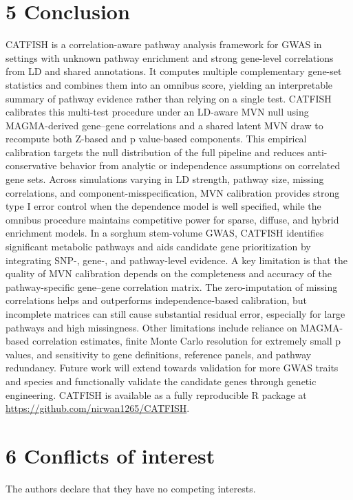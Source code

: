 \documentclass[unnumsec,webpdf,contemporary,large]{oup-authoring-template}%
\theoremstyle{thmstyleone}%
\theoremstyle{thmstyletwo}%
\theoremstyle{thmstylethree}%
\begin{document}
\section{5 Conclusion}

CATFISH is a correlation-aware pathway analysis framework for GWAS in settings with unknown pathway enrichment and strong gene-level correlations from LD and shared annotations. It computes multiple complementary gene-set statistics and combines them into an omnibus score, yielding an interpretable summary of pathway evidence rather than relying on a single test. CATFISH calibrates this multi-test procedure under an LD-aware MVN null using MAGMA-derived gene–gene correlations and a shared latent MVN draw to recompute both Z-based and p value-based components. This empirical calibration targets the null distribution of the full pipeline and reduces anti-conservative behavior from analytic or independence assumptions on correlated gene sets. Across simulations varying in LD strength, pathway size, missing correlations, and component-misspecification, MVN calibration provides strong type I error control when the dependence model is well specified, while the omnibus procedure maintains competitive power for sparse, diffuse, and hybrid enrichment models. In a sorghum stem-volume GWAS, CATFISH identifies significant metabolic pathways and aids candidate gene prioritization by integrating SNP-, gene-, and pathway-level evidence. A key limitation is that the quality of MVN calibration depends on the completeness and accuracy of the pathway-specific gene–gene correlation matrix. The zero-imputation of missing correlations helps and outperforms independence-based calibration, but incomplete matrices can still cause substantial residual error, especially for large pathways and high missingness. Other limitations include reliance on MAGMA-based correlation estimates, finite Monte Carlo resolution for extremely small p values, and sensitivity to gene definitions, reference panels, and pathway redundancy. Future work will extend towards validation for more GWAS traits and species and functionally validate the candidate genes through genetic engineering. CATFISH is available as a fully reproducible R package at \url{https://github.com/nirwan1265/CATFISH}.



\section{6 Conflicts of interest}
The authors declare that they have no competing interests.
\end{document}
